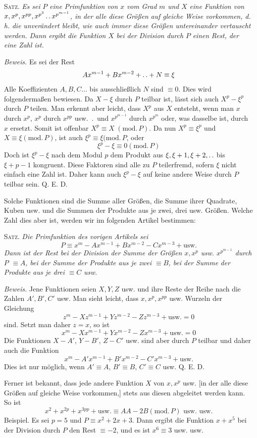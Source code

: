 \textsc{Satz.} \emph{Es sei $P$ eine Primfunktion von $x$ vom Grad $m$ und $X$ eine Funktion von $x,x^p,x^{pp},x^{p^3}\mathinner{.\,.} x^{p^{m-1}}$, in der alle diese Größen auf gleiche Weise vorkommen, d. h. die unverändert bleibt, wie auch immer diese Größen untereinander vertauscht werden. Dann ergibt die Funktion $X$ bei der Division durch $P$ einen Rest, der eine Zahl ist.}

\emph{Beweis.} Es sei der Rest
\[
Ax^{m-1}+Bx^{m-2}+\mathinner{.\,.}+N\equiv\xi
\]
Alle Koeffizienten $A,B,C\ldots$ bis ausschließlich $N$ sind $\equiv0$. Dies wird folgendermaßen bewiesen. Da $X-\xi$ durch $P$ teilbar ist, lässt sich auch $X^p-\xi^p$ durch $P$ teilen.
Man erkennt aber leicht, dass $X^p$ aus $X$ entsteht, wenn man $x$ durch $x^p$, $x^p$ durch $x^{pp}$ usw.\ .\ und $x^{p^{m-1}}$ durch $x^{p^m}$ oder, was dasselbe ist, durch $x$ ersetzt. Somit ist offenbar $X^p\equiv X\;(\mathrm{mod.}\,P)$. Da nun $X^p\equiv\xi^p$ und $X\equiv\xi(\mathrm{mod.}\,P)$, ist auch $\xi^p\equiv\xi(\mathrm{mod.}\,P$, oder
\[
\xi^p-\xi\equiv0(\mathrm{mod.}\,P)
\]
Doch ist $\xi^p-\xi$ nach dem Modul $p$ dem Produkt aus $\xi,\xi+1,\xi+2,\mathinner{.\,.}$ bis $\xi+p-1$ kongruent. Diese Faktoren sind alle zu $P$ teilerfremd, sofern $\xi$ nicht einfach eine Zahl ist. Daher kann auch $\xi^p-\xi$ auf keine andere Weise durch $P$ teilbar sein. Q. E. D.

Solche Funktionen sind die Summe aller Größen, die Summe ihrer Quadrate, Kuben usw. und die Summen der Produkte aus je zwei, drei usw. Größen. Welche Zahl dies aber ist, werden wir im folgenden Artikel bestimmen:

\textsc{Satz.} \emph{Die Primfunktion des vorigen Artikels sei}
\[
P\equiv x^m-Ax^{m-1}+Bx^{m-2}-Cx^{m-3}+\text{usw.}
\]
\emph{Dann ist der Rest bei der Division der Summe der Größen $x,x^p$ usw. $x^{p^{m-1}}$ durch $P$ $\equiv A$, bei der Summe der Produkte aus je zwei $\equiv B$, bei der Summe der Produkte aus je drei $\equiv C$ usw.}

\emph{Beweis.} Jene Funktionen seien $X,Y,Z$ usw. und ihre Reste der Reihe nach die Zahlen $A',B',C'$ usw. Man sieht leicht, dass $x,x^p,x^{pp}$ usw. Wurzeln der Gleichung
\[
z^m-Xz^{m-1}+Yz^{m-2}-Zz^{m-3}+\text{usw.}=0
\]
sind. Setzt man daher $z=x$, so ist
\[
x^m-Xx^{m-1}+Yx^{m-2}-Zx^{m-3}+\text{usw.}=0
\]
Die Funktionen $X-A'$, $Y-B'$, $Z-C'$ usw. sind aber durch $P$ teilbar und daher auch die Funktion
\[
x^m-A'x^{m-1}+B'x^{m-2}-C'x^{m-3}+\text{usw.}
\]
Dies ist nur möglich, wenn $A'\equiv A$, $B'\equiv B$, $C'\equiv C$ usw. Q. E. D.

Ferner ist bekannt, dass jede andere Funktion $X$ von $x,x^p$ usw. [in der alle diese Größen auf gleiche Weise vorkommen,] stets aus diesen abgeleitet werden kann. So ist
\[
x^2+x^{2p}+x^{3pp}+\text{usw.}\equiv AA-2B(\mathrm{mod.}\,P)\text{ usw. usw.}
\]
Beispiel. Es sei $p=5$ und $P\equiv x^2+2x+3$. Dann ergibt die Funktion $x+x^5$ bei der Division durch $P$ den Rest $\equiv-2$, und es ist $x^6\equiv3$ usw. usw.
